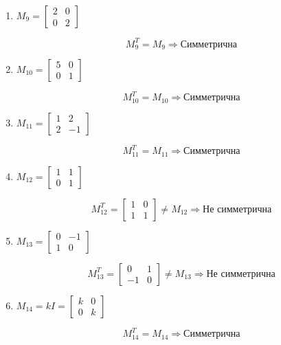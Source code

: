 \begin{enumerate}
  \item $M_9 = 
  \begin{bmatrix}
    2 & 0 \\
    0 & 2
  \end{bmatrix}$

  \[
    M_9^T = M_9 \Rightarrow \text{Симметрична}
  \]

  \item $M_{10} = 
  \begin{bmatrix}
    5 & 0 \\
    0 & 1
  \end{bmatrix}$

  \[
    M_{10}^T = M_{10} \Rightarrow \text{Симметрична}
  \]

  \item $M_{11} = 
  \begin{bmatrix}
    1 & 2 \\
    2 & -1
  \end{bmatrix}$

  \[
    M_{11}^T = M_{11} \Rightarrow \text{Симметрична}
  \]

  \item $M_{12} = 
  \begin{bmatrix}
    1 & 1 \\
    0 & 1
  \end{bmatrix}$

  \[
    M_{12}^T = 
    \begin{bmatrix}
      1 & 0 \\
      1 & 1
    \end{bmatrix} \neq M_{12} \Rightarrow \text{Не симметрична}
  \]

  \item $M_{13} = 
  \begin{bmatrix}
    0 & -1 \\
    1 & 0
  \end{bmatrix}$

  \[
    M_{13}^T = 
    \begin{bmatrix}
      0 & 1 \\
      -1 & 0
    \end{bmatrix} \neq M_{13} \Rightarrow \text{Не симметрична}
  \]

  \item $M_{14} = kI = 
  \begin{bmatrix}
    k & 0 \\
    0 & k
  \end{bmatrix}$

  \[
    M_{14}^T = M_{14} \Rightarrow \text{Симметрична}
  \]
\end{enumerate}

